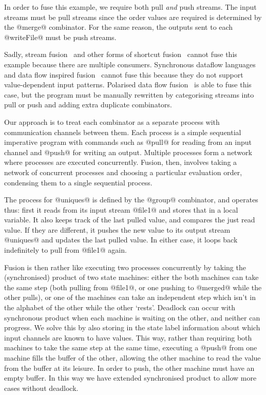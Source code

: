 In order to fuse this example, we require both pull \emph{and} push streams.
The input streams must be pull streams since the order values are required is determined by the @merge@ combinator.
For the same reason, the outputs sent to each @writeFile@ must be push streams.


Sadly, stream fusion~\cite{coutts2007stream} and other forms of shortcut fusion~\cite{jones2001playing} cannot fuse this example because there are multiple consumers.
Synchronous dataflow languages~\cite{mandel2010lucy} and data flow inspired fusion~\cite{lippmeier2013data} cannot fuse this because they do not support value-dependent input patterns.
Polarised data flow fusion~\cite{lippmeier2016polarized} is able to fuse this case, but the program must be manually rewritten by categorising streams into pull or push and adding extra duplicate combinators.

Our approach is to treat each combinator as a separate process with communication channels between them.
Each process is a simple sequential imperative program with commands such as @pull@ for reading from an input channel and @push@ for writing an output.
Multiple processes form a network where processes are executed concurrently.
Fusion, then, involves taking a network of concurrent processes and choosing a particular evaluation order, condensing them to a single sequential process.

The process for @uniques@ is defined by the @group@ combinator, and operates thus: first it reads from its input stream @file1@ and stores that in a local variable.
It also keeps track of the last pulled value, and compares the just read value.
If they are different, it pushes the new value to its output stream @uniques@ and updates the last pulled value.
In either case, it loops back indefinitely to pull from @file1@ again.

Fusion is then rather like executing two processes concurrently by taking the (synchronised) product of two state machines: either the both machines can take the same step (both pulling from @file1@, or one pushing to @merged@ while the other pulls), or one of the machines can take an independent step which isn't in the alphabet of the other while the other `rests'.
Deadlock can occur with synchronous product when each machine is waiting on the other, and neither can progress.
We solve this by also storing in the state label information about which input channels are known to have values.
This way, rather than requiring both machines to take the same step at the same time, executing a @push@ from one machine fills the buffer of the other, allowing the other machine to read the value from the buffer at its leisure.
In order to push, the other machine must have an empty buffer.
In this way we have extended synchronised product to allow more cases without deadlock.


